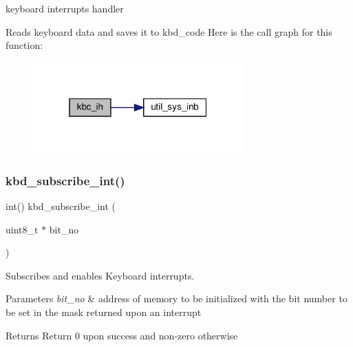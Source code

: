 keyboard interrupts handler 

Reads keyboard data and saves it to kbd\+\_\+code Here is the call graph for this function\+:\nopagebreak
\begin{figure}[H]
\begin{center}
\leavevmode
\includegraphics[width=229pt]{group__Keyboard_gaea970a154161a35f6894898a092ed70a_cgraph}
\end{center}
\end{figure}
\mbox{\label{group__Keyboard_ga4ac9231a99a664d6a9f0b69767e0d707}} 
\subsubsection{\texorpdfstring{kbd\+\_\+subscribe\+\_\+int()}{kbd\_subscribe\_int()}}
{\footnotesize\ttfamily int() kbd\+\_\+subscribe\+\_\+int (\begin{DoxyParamCaption}\item[{uint8\+\_\+t $\ast$}]{bit\+\_\+no }\end{DoxyParamCaption})}



Subscribes and enables Keyboard interrupts. 


\begin{DoxyParams}{Parameters}
{\em bit\+\_\+no} & address of memory to be initialized with the bit number to be set in the mask returned upon an interrupt \\
\hline
\end{DoxyParams}
\begin{DoxyReturn}{Returns}
Return 0 upon success and non-\/zero otherwise 
\end{DoxyReturn}
\mbox{\label{group__Keyboard_gaee0a7b54ee426fade9c780418d110fe0}} 
